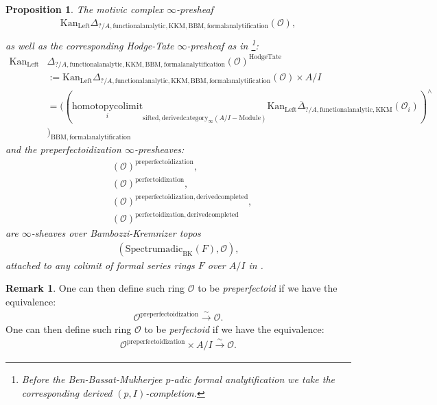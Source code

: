 \documentclass[11pt]{book}
\newtheorem{proposition}[theorem]{Proposition}
\theoremstyle{definition}
\newtheorem{remark}[theorem]{Remark}
\numberwithin{equation}{section}
\begin{document}
\begin{proposition}
The motivic complex $\infty$-presheaf 
\begin{align}
\mathrm{Kan}_{\mathrm{Left}}\Delta_{?/A,\mathrm{functionalanalytic,KKM},\mathrm{BBM,formalanalytification}}(\mathcal{O}),\\
\end{align}
as well as the corresponding Hodge-Tate $\infty$-presheaf as in \cite{12BS}{\footnote{Before the Ben-Bassat-Mukherjee $p$-adic formal analytification we take the corresponding derived $(p,I)$-completion.}}:
\begin{align}
\mathrm{Kan}_{\mathrm{Left}}&\Delta_{?/A,\mathrm{functionalanalytic,KKM},\mathrm{BBM,formalanalytification}}(\mathcal{O})^{\mathrm{HodgeTate}}\\
&:=\mathrm{Kan}_{\mathrm{Left}}\Delta_{?/A,\mathrm{functionalanalytic,KKM},\mathrm{BBM,formalanalytification}}(\mathcal{O})\times A/I\\
&=((\underset{i}{\mathrm{homotopycolimit}}_{\mathrm{sifted},\mathrm{derivedcategory}_{\infty}(A/I-\mathrm{Module})}\mathrm{Kan}_{\mathrm{Left}}\overline{\Delta}_{?/A,\mathrm{functionalanalytic,KKM}}(\mathcal{O}_i))^\wedge\\
&)_\mathrm{BBM,formalanalytification}	
\end{align}
and the preperfectoidization $\infty$-presheaves:
\begin{align}
&(\mathcal{O})^{\mathrm{preperfectoidization}},\\
&(\mathcal{O})^{\mathrm{perfectoidization}},\\
&(\mathcal{O})^{\mathrm{preperfectoidization,derivedcompleted}},\\
&(\mathcal{O})^{\mathrm{perfectoidization,derivedcompleted}}
\end{align}
are $\infty$-sheaves over Bambozzi-Kremnizer topos
\begin{align}
(\mathrm{Spectrumadic}_{\mathrm{BK}}(F),\mathcal{O}),	
\end{align}
attached to any colimit of formal series rings $F$ over $A/I$ in \cite{12BK}.\\	
\end{proposition}


\begin{remark}
One can then define such ring $\mathcal{O}$ to be \textit{preperfectoid} if we have the equivalence:
\begin{align}
\mathcal{O}^{\text{preperfectoidization}} \overset{\sim}{\longrightarrow}	\mathcal{O}.
\end{align}
One can then define such ring $\mathcal{O}$ to be \textit{perfectoid} if we have the equivalence:
\begin{align}
\mathcal{O}^{\text{preperfectoidization}}\times A/I \overset{\sim}{\longrightarrow}	\mathcal{O}.
\end{align}
	
\end{remark}
\end{document}

